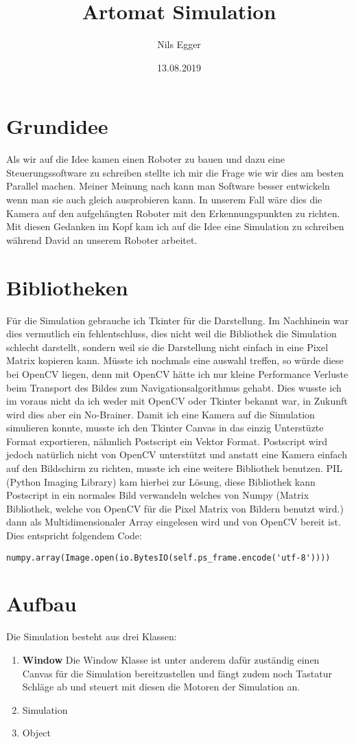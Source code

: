 \documentclass[12pt]{article}
\title{Artomat Simulation}
\author{Nils Egger}
\date{13.08.2019}
\begin{document}
\maketitle

\section{Grundidee}

Als wir auf die Idee kamen einen Roboter zu bauen und dazu eine Steuerungssoftware zu schreiben stellte ich mir die Frage wie wir dies am besten Parallel machen. Meiner Meinung nach kann man Software besser entwickeln wenn man sie auch gleich ausprobieren kann. In unserem Fall wäre dies die Kamera auf den aufgehängten Roboter mit den Erkennungspunkten zu richten. Mit diesen Gedanken im Kopf kam ich auf die Idee eine Simulation zu schreiben während David an unserem Roboter arbeitet.

\section{Bibliotheken}
Für die Simulation gebrauche ich Tkinter für die Darstellung. Im Nachhinein war dies vermutlich ein fehlentschluss, dies nicht weil die Bibliothek die Simulation schlecht darstellt, sondern weil sie die Darstellung nicht einfach in eine Pixel Matrix kopieren kann.
Müsste ich nochmals eine auswahl treffen, so würde diese bei OpenCV liegen, denn mit OpenCV hätte ich nur kleine Performance Verluste beim Transport des Bildes zum Navigationsalgorithmus gehabt. Dies wusste ich im voraus nicht da ich weder mit OpenCV oder Tkinter bekannt war, in Zukunft wird dies aber ein No-Brainer.
Damit ich eine Kamera auf die Simulation simulieren konnte, musste ich den Tkinter Canvas in das einzig Unterstüzte Format exportieren, nähmlich Postscript ein Vektor Format. Postscript wird jedoch natürlich nicht von OpenCV unterstützt und anstatt eine Kamera einfach auf den Bildschirm zu richten, musste ich eine weitere Bibliothek benutzen. PIL (Python Imaging Library) kam hierbei zur Lösung, diese Bibliothek kann Postscript in ein normales Bild verwandeln welches von Numpy (Matrix Bibliothek, welche von OpenCV für die Pixel Matrix von Bildern benutzt wird.) dann als Multidimensionaler Array eingelesen wird und von OpenCV bereit ist.
Dies entspricht folgendem Code:
\begin{lstlisting}
numpy.array(Image.open(io.BytesIO(self.ps_frame.encode('utf-8'))))
\end{lstlisting}

\section{Aufbau}
Die Simulation besteht aus drei Klassen:
\begin{enumerate} 
\item \textbf{Window}\newline
Die Window Klasse ist unter anderem dafür zuständig einen Canvas für die Simulation bereitzustellen und fängt zudem noch Tastatur Schläge ab und steuert mit diesen die Motoren der Simulation an.
\item Simulation
\item Object
\end{enumerate}
\end{document}

